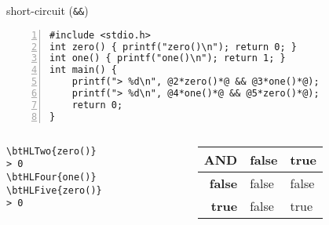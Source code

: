 \begin{frame}[fragile,label=shortCircuitAnd]{short-circuit (\texttt{\&\&})}
\begin{lstlisting}[numbers=left,xleftmargin=1cm,style=small]
#include <stdio.h>
int zero() { printf("zero()\n"); return 0; }
int one() { printf("one()\n"); return 1; }
int main() {
    printf("> %d\n", @2*zero()*@ && @3*one()*@);
    printf("> %d\n", @4*one()*@ && @5*zero()*@);
    return 0;
}
\end{lstlisting}
\begin{columns}[b]
\begin{column}{0.3\textwidth}
\def\btHLTwo{\btHL<2|handout:0>}
\def\btHLFour{\btHL<4|handout:0>}
\def\btHLFive{\btHL<5|handout:0>}
\begin{Verbatim}[commandchars=\\\{\}]
\btHLTwo{zero()}
> 0
\btHLFour{one()}
\btHLFive{zero()}
> 0
\end{Verbatim} 
\vspace{0pt}
\end{column}
\begin{column}[b]{0.7\textwidth}
\begin{tabular}{r|ll}
AND & \bf { false} & {\bf true} \\ \hline
\bf false & { false} & { false} \\
\bf true & { false} & { true} \\
\end{tabular}
\vspace{1em}
\end{column}
\end{columns}
\end{frame}

